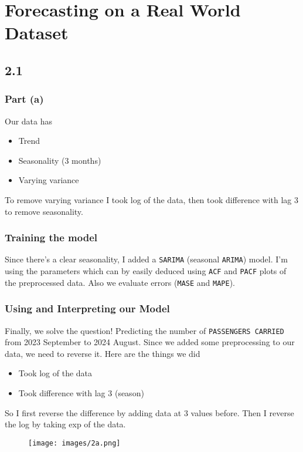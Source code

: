 \section{Forecasting on a Real World Dataset}
\subsection{2.1}
\subsubsection{Part (a)}
Our data has
\begin{itemize}[nosep]
	\item Trend
	\item Seasonality (3 months)
	\item Varying variance
\end{itemize}

To remove varying variance I took log of the data, then took difference with
lag 3 to remove seasonality.
\subsubsection{Training the model}
Since there's a clear seasonality, I added a \texttt{SARIMA} (seasonal \texttt{ARIMA}) model.
I'm using the parameters which can by easily deduced using \texttt{ACF} and \texttt{PACF} plots
of the preprocessed data. Also we evaluate errors (\texttt{MASE} and \texttt{MAPE}).
\subsubsection{Using and Interpreting our Model}
Finally, we solve the question! Predicting the number of \texttt{PASSENGERS CARRIED}
from 2023 September to 2024 August. Since we added some preprocessing to our
data, we need to reverse it. Here are the things we did
\begin{itemize}[nosep]
	\item Took log of the data
	\item Took difference with lag 3 (season)
\end{itemize}

So I first reverse the difference by adding data at 3 values before. Then I
reverse the log by taking exp of the data.

\begin{figure}[H]
	\centering
	\texttt{[image: images/2a.png]}
\end{figure}

